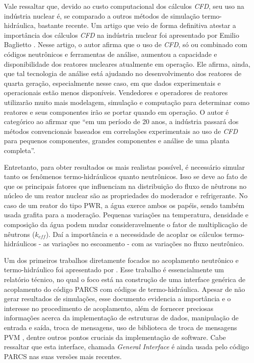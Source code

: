 Vale ressaltar que, devido ao custo computacional dos cálculos \textit{CFD}, seu uso na indústria
nuclear é, se comparado a outros métodos de simulação termo-hidráulica, bastante recente. Um artigo que
veio de forma definitiva atestar a importância dos cálculos \textit{CFD} na indústria nuclear
foi apresentado por Emilio Baglietto \cite{Baglietto2011}. Nesse artigo, o autor afirma
que o uso de \textit{CFD}, só ou combinado com códigos neutrônicos e ferramentas
de análise, aumentou a capacidade e disponibilidade dos reatores nucleares
atualmente em operação. Ele afirma,
ainda, que tal tecnologia de análise está ajudando no desenvolvimento dos reatores
de quarta geração, especialmente nesse caso, em que dados experimentais e operacionais
estão menos disponíveis. Vendedores e operadores de reatores utilizarão muito mais
modelagem, simulação e computação para determinar como reatores e seus componentes
irão se portar quando em operação. O autor é categórico ao afirmar que ``em um
período de 20 anos, a indústria passará dos métodos convencionais baseados em
correlações experimentais ao uso de \textit{CFD} para pequenos componentes, grandes componentes
e análise de uma planta completa''. 

Entretanto, para obter resultados os mais realistas possível, é necessário simular 
tanto os fenômenos termo-hidráulicos quanto neutrônicos. Isso 
se deve ao fato de que os principais fatores que influenciam na distribuição do fluxo de 
nêutrons no núcleo de um reator nuclear são as propriedades do moderador e refrigerante. No caso de um
reator do tipo PWR, a água exerce ambos os papéis, sendo também usada grafita para 
a moderação. Pequenas variações na temperatura, densidade e composição 
da água podem mudar consideravelmente o fator de multiplicação de nêutrons ($k_{eff}$). Daí a importância e 
a necessidade de acoplar os cálculos termo-hidráulicos - as variações no escoamento - com as variações 
no fluxo neutrônico.


Um dos primeiros trabalhos diretamente focados no 
acoplamento neutrônico e termo-hidráulico foi apresentado por \cite{Barber98}. Esse trabalho 
é essencialmente um relatório técnico, no qual o foco está na construção de uma interface 
genérica de acoplamento do código PARCS com códigos de termo-hidráulica. Apesar de não 
gerar resultados de simulações, esse documento evidencia a importância e o interesse 
no procedimento de acoplamento, além de fornecer preciosas informações acerca da 
implementação de estruturas de dados, manipulação de entrada e saída, troca de mensagens, 
uso de biblioteca de troca de mensagens PVM \cite{Geist94}, dentre outros pontos cruciais
da implementação de software. Cabe ressaltar que esta interface, 
chamada \textit{General Interface} é ainda usada pelo código PARCS nas suas versões mais 
recentes. 

